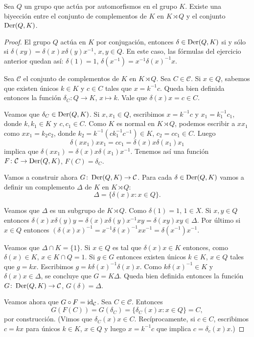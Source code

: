 \begin{theorem}
	\label{theorem:complementos}
	Sea $Q$ un grupo que actúa por automorfismos en el grupo $K$.  Existe una
	biyección entre el conjunto de complementos de $K$ en $K\rtimes Q$ y el
	conjunto $\operatorname{Der}(Q,K)$.
\end{theorem}

\begin{proof}
	El grupo $Q$ actúa en $K$ por conjugación, entonces $\delta\in\operatorname{Der}(Q,K)$ si
	y sólo si $\delta(xy)=\delta(x)x\delta(y)x^{-1}$, $x,y\in Q$. En este caso,
	las fórmulas del ejercicio anterior quedan así:
	$\delta(1)=1$, $\delta(x^{-1})=x^{-1}\delta(x)^{-1}x$.
	
	Sea $\mathcal{C}$ el conjunto de complementos de $K$ en $K\rtimes Q$.  Sea
	$C\in\mathcal{C}$. Si $x\in Q$, sabemos que 
	existen únicos $k\in K$ y $c\in C$ tales que $x=k^{-1}c$. Queda bien
	definida entonces la función $\delta_C\colon Q\to K$, $x\mapsto k$. Vale
	que $\delta(x)x=c\in C$. 
	
	Veamos que $\delta_C\in\operatorname{Der}(Q,K)$. Si $x,x_1\in Q$, escribimos $x=k^{-1}c$
	y $x_1=k_1^{-1}c_1$, donde $k,k_1\in K$ y $c,c_1\in C$. Como $K$ es normal
	en $K\rtimes Q$, podemos escribir a $xx_1$ como $xx_1=k_2c_2$, donde
	$k_2=k^{-1}(ck_1^{-1}c^{-1})\in K$, $c_2=cc_1\in C$. Luego 
	\[
		\delta(xx_1)xx_1=cc_1=\delta(x)x\delta(x_1)x_1
	\]
	implica que $\delta(xx_1)=\delta(x)x\delta(x_1)x^{-1}$. 
	Tenemos así una función $F\colon\mathcal{C}\to\operatorname{Der}(Q,K)$, $F(C)=\delta_C$.

	Vamos a construir ahora $G\colon\operatorname{Der}(Q,K)\to\mathcal{C}$. 
	Para
	cada $\delta\in\operatorname{Der}(Q,K)$ vamos a definir un complemento $\Delta$ de $K$ en $K\rtimes Q$: 
	\[
	\Delta=\{\delta(x)x:x\in Q\}.
	\]

	Veamos que $\Delta$ es un subgrupo de $K\rtimes Q$. Como $\delta(1)=1$,
	$1\in X$. Si $x,y\in Q$ entonces
	$\delta(x)x\delta(y)y=\delta(x)x\delta(y)x^{-1}xy=\delta(xy)xy\in \Delta$.
	Por último si $x\in Q$ entonces
	$(\delta(x)x)^{-1}=x^{-1}\delta(x)^{-1}xx^{-1}=\delta(x^{-1})x^{-1}$.
	
	
	Veamos que $\Delta\cap K=\{1\}$. Si $x\in Q$ es tal que $\delta(x)x\in K$
	entonces, como $\delta(x)\in K$, $x\in K\cap Q=1$. Si $g\in G$ entonces
	existen únicos $k\in K$, $x\in Q$ tales que $g=kx$. Escribimos
	$g=k\delta(x)^{-1}\delta(x)x$. Como $k\delta(x)^{-1}\in K$ y $\delta(x)x\in
	\Delta$, se concluye que $G=K\Delta$. Queda bien definida entonces la
	función $G\colon\operatorname{Der}(Q,K)\to\mathcal{C}$, $G(\delta)=\Delta$.

	Veamos ahora que $G\circ F=\operatorname{id}_{\mathcal{C}}$. 
	Sea $C\in\mathcal{C}$. Entonces 
	\[
	G(F(C))=G(\delta_C)=\{\delta_C(x)x:x\in
	Q\}=C,
	\]
	por construcción. (Vimos que $\delta_C(x)x\in C$. Recíprocamente,  si $c\in
	C$, escribimos $c=kx$ para únicos $k\in K$, $x\in Q$ y luego $x=k^{-1}c$
	que implica $c=\delta_c(x)x$.)


\end{proof}
